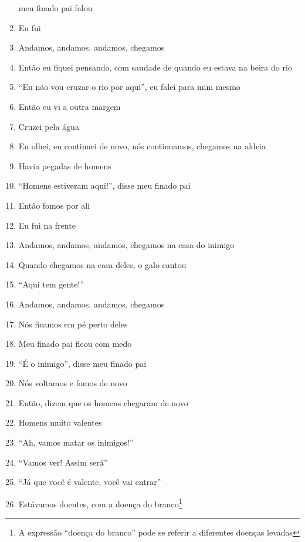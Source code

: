 \begin{enumerate}
 meu finado pai falou
 \begin{center}\end{center}
 \item Eu fui
 \item Andamos, andamos, andamos, chegamos
 \item Então eu fiquei pensando, com saudade de quando eu estava na beira do
 rio
 \item ``Eu não vou cruzar o rio por aqui'', eu falei para mim mesmo
 \item Então eu vi a outra margem
 \item Cruzei pela água
 \begin{center}\end{center}
 \item Eu olhei, eu continuei de novo, nós continuamos, chegamos na aldeia
 \item Havia pegadas de homens
 \item ``Homens estiveram aqui!'', disse meu finado pai
 \item Então fomos por ali
 \item Eu fui na frente
 \item Andamos, andamos, andamos, chegamos na casa do inimigo
 \item Quando chegamos na casa deles, o galo cantou
 \item ``Aqui tem gente!''
 \begin{center}\end{center}
 \item Andamos, andamos, andamos, chegamos
 \item Nós ficamos em pé perto deles
 \item Meu finado pai ficou com medo
 \item ``É o inimigo'', disse meu finado pai
 \begin{center}\end{center}
 \item Nós voltamos e fomos de novo
 \item Então, dizem que os homens chegaram de novo
 \item Homens muito valentes
 \item ``Ah, vamos matar os inimigos!''
 \item ``Vamos ver! Assim será''
 \item ``Já que você é valente, você vai entrar''
 \item Estávamos doentes, com a doença do branco\footnote{A expressão
   ``doença do branco'' pode se referir a diferentes doenças levadas
}
\end{enumerate}
